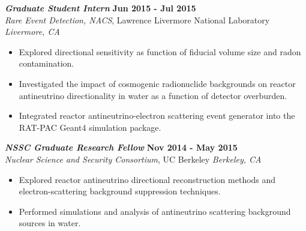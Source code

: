 {\sl\bf Graduate Student Intern} \hfill {\bf Jun 2015 - Jul 2015} \\
{\sl Rare Event Detection, NACS}, Lawrence Livermore National Laboratory \hfill {\sl Livermore, CA} \\[-2.8ex]
\vspace{2pt}
\begin{itemize}[leftmargin=4ex] \itemsep -2pt
\item Explored directional sensitivity as function of fiducial volume size and radon contamination.
\item Investigated the impact of cosmogenic radionuclide backgrounds on reactor antineutrino directionality in water as a function of detector overburden.
\item Integrated reactor antineutrino-electron scattering event generator into the RAT-PAC Geant4 simulation package.
\end{itemize} 

{\sl\bf NSSC Graduate Research Fellow} \hfill {\bf Nov 2014 - May 2015} \\
{\sl Nuclear Science and Security Consortium}, UC Berkeley \hfill {\sl Berkeley, CA} \\[-2.8ex]
\vspace{2pt}
\begin{itemize}[leftmargin=4ex] \itemsep -2pt
\item Explored reactor antineutrino directional reconstruction methods and electron-scattering background suppression techniques.
\item Performed simulations and analysis of antineutrino scattering background sources in water.
\end{itemize} 
 
